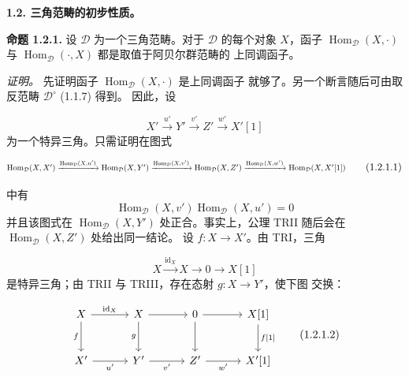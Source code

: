 \clearpage
{}%
\begingroup
\small
\setlength{\abovedisplayskip}{4pt plus 2pt minus 2pt}%
\setlength{\belowdisplayskip}{4pt plus 2pt minus 2pt}%

\medskip
\noindent\textbf{1.2. 三角范畴的初步性质。}

\medskip
\noindent\textbf{命题 1.2.1.}\quad
设 $\mathcal D$ 为一个三角范畴。对于 $\mathcal D$ 的每个对象 $X$，函子
$\operatorname{Hom}_{\mathcal D}(X,\mathord\cdot)$ 与
$\operatorname{Hom}_{\mathcal D}(\mathord\cdot,X)$ 都是取值于阿贝尔群范畴的
上同调函子。

\noindent\emph{证明。}\quad
先证明函子 $\operatorname{Hom}_{\mathcal D}(X,\mathord\cdot)$ 是上同调函子
就够了。另一个断言随后可由取反范畴 $\mathcal D^\circ$ (1.1.7) 得到。
因此，设

\[
  X'\xrightarrow{u'}Y'\xrightarrow{v'}Z'\xrightarrow{w'}X'[1]
\]
为一个特异三角。只需证明在图式

\begin{equation}
  \resizebox{0.98\linewidth}{!}{$
    \operatorname{Hom}_{\mathcal D}(X,X')
    \xrightarrow{\operatorname{Hom}_{\mathcal D}(X,u')}
    \operatorname{Hom}_{\mathcal D}(X,Y')
    \xrightarrow{\operatorname{Hom}_{\mathcal D}(X,v')}
    \operatorname{Hom}_{\mathcal D}(X,Z')
    \xrightarrow{\operatorname{Hom}_{\mathcal D}(X,w')}
    \operatorname{Hom}_{\mathcal D}(X,X'[1])
  $}
  \tag{1.2.1.1}
\end{equation}

中有
\[
  \operatorname{Hom}_{\mathcal D}(X,v')
  \operatorname{Hom}_{\mathcal D}(X,u')=0
\]
并且该图式在 $\operatorname{Hom}_{\mathcal D}(X,Y')$ 处正合。事实上，公理
TRII 随后会在 $\operatorname{Hom}_{\mathcal D}(X,Z')$ 处给出同一结论。
设 $f\colon X\longrightarrow X'$。由 TRI，三角

\[
  X\xrightarrow{\operatorname{id}_X}X\longrightarrow0\longrightarrow X[1]
\]
是特异三角；由 TRII 与 TRIII，存在态射 $g\colon X\longrightarrow Y'$，使下图
交换：

\begin{equation}
  \begin{tikzcd}[column sep=3.2em,row sep=2.5em]
    X \arrow[r,"{\operatorname{id}_X}"] \arrow[d,"f"']
      & X \arrow[r] \arrow[d,"g"']
      & 0 \arrow[r] \arrow[d]
      & X[1] \arrow[d,"{f[1]}"] \\
    X' \arrow[r,"u'"']
      & Y' \arrow[r,"v'"']
      & Z' \arrow[r,"w'"']
      & X'[1]
  \end{tikzcd}
  \tag{1.2.1.2}
\end{equation}

